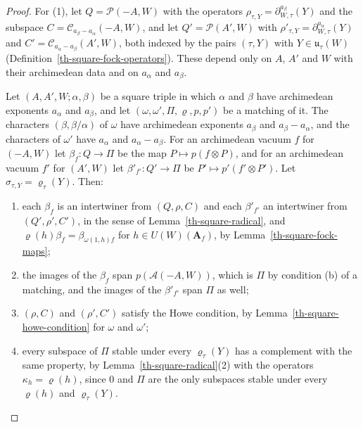 \begin{proof}
For (1), let $Q=\mathcal P(-A,W)$ with the operators
$\rho_{\tau,Y}=\partial^{a_\beta}_{W,\tau}(Y)$ and the subspace
$C=\mathcal C_{a_\beta-a_\alpha}(-A,W)$, and let $Q'=\mathcal P(A',W)$ with
$\rho'_{\tau,Y}=\partial^{a_\alpha}_{W,\tau}(Y)$ and
$C'=\mathcal C_{a_\alpha-a_\beta}(A',W)$, both indexed by the pairs $(\tau,Y)$
with $Y\in\mathfrak u_\tau(W)$ (Definition~\ref{th-square-fock-operators}).
These depend only on $A$, $A'$ and $W$ with their archimedean data and on
$a_\alpha$ and $a_\beta$.

Let $(A,A',W;\alpha,\beta)$ be a square triple in which $\alpha$ and $\beta$
have archimedean exponents $a_\alpha$ and $a_\beta$, and let
$(\omega,\omega',\Pi,\varrho,p,p')$ be a matching of it. The characters
$(\beta,\beta/\alpha)$ of $\omega$ have archimedean exponents $a_\beta$ and
$a_\beta-a_\alpha$, and the characters of $\omega'$ have $a_\alpha$ and
$a_\alpha-a_\beta$. For an archimedean vacuum $f$ for $(-A,W)$ let
$\beta_f\colon Q\to\Pi$ be the map $P\mapsto p(f\otimes P)$, and for an
archimedean vacuum $f'$ for $(A',W)$ let $\beta'_{f'}\colon Q'\to\Pi$ be
$P'\mapsto p'(f'\otimes P')$. Let $\sigma_{\tau,Y}=\varrho_\tau(Y)$. Then:
\begin{enumerate}
\item[(i)] each $\beta_f$ is an intertwiner from $(Q,\rho,C)$ and each
  $\beta'_{f'}$ an intertwiner from $(Q',\rho',C')$, in the sense of
  Lemma~\ref{th-square-radical}, and $\varrho(h)\beta_f=\beta_{\omega(1,h)f}$
  for $h\in U(W)(\mathbf A_f)$, by Lemma~\ref{th-square-fock-maps};
\item[(ii)] the images of the $\beta_f$ span $p(\mathcal A(-A,W))$, which is
  $\Pi$ by condition (b) of a matching, and the images of the $\beta'_{f'}$
  span $\Pi$ as well;
\item[(iii)] $(\rho,C)$ and $(\rho',C')$ satisfy the Howe condition, by
  Lemma~\ref{th-square-howe-condition} for $\omega$ and $\omega'$;
\item[(iv)] every subspace of $\Pi$ stable under every $\varrho_\tau(Y)$ has a
  complement with the same property, by Lemma~\ref{th-square-radical}(2) with
  the operators $\kappa_h=\varrho(h)$, since $0$ and $\Pi$ are the only
  subspaces stable under every $\varrho(h)$ and $\varrho_\tau(Y)$.
\end{enumerate}


\end{proof}
